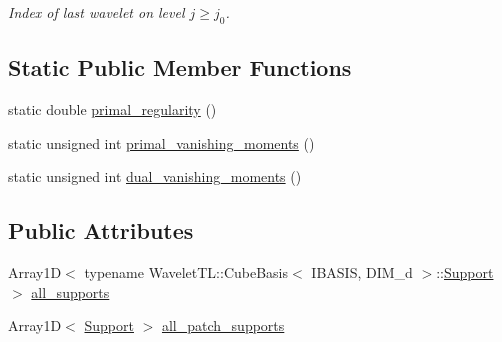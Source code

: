 \begin{CompactItemize}
\begin{CompactList}\small\item\em Index of last wavelet on level $j \geq j_0$. \item\end{CompactList}\end{CompactItemize}
\subsection*{Static Public Member Functions}
\begin{CompactItemize}
\item 
static double \hyperlink{classFrameTL_1_1AggregatedFrame_eed976f2ee6c11cfae388c80fffa5fce}{primal\_\-regularity} ()
\item 
static unsigned int \hyperlink{classFrameTL_1_1AggregatedFrame_3057372270397c20f4705ac9281478e3}{primal\_\-vanishing\_\-moments} ()
\item 
static unsigned int \hyperlink{classFrameTL_1_1AggregatedFrame_2716c6746c81fa02f22a43ef43b98ffc}{dual\_\-vanishing\_\-moments} ()
\end{CompactItemize}
\subsection*{Public Attributes}
\begin{CompactItemize}
\item 
Array1D$<$ typename WaveletTL::CubeBasis$<$ IBASIS, DIM\_\-d $>$::\hyperlink{structFrameTL_1_1AggregatedFrame_1_1Support}{Support} $>$ \hyperlink{classFrameTL_1_1AggregatedFrame_79046c4fc86d939e165aa11a5c7d9f9a}{all\_\-supports}
\item 
Array1D$<$ \hyperlink{structFrameTL_1_1AggregatedFrame_1_1Support}{Support} $>$ \hyperlink{classFrameTL_1_1AggregatedFrame_f7a07f1fdbbd8a04b594d043e273ed0f}{all\_\-patch\_\-supports}
\end{CompactItemize}
